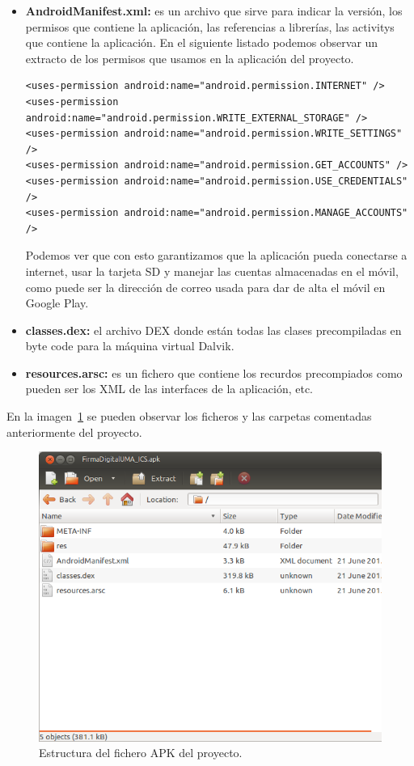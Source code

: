 \begin{itemize}
\item \textbf{AndroidManifest.xml:} es un archivo que sirve para indicar la versión, los permisos que contiene la aplicación, las referencias a librerías, las activitys que contiene la aplicación. En el siguiente listado podemos observar un extracto de los permisos que usamos en la aplicación del proyecto.

\begin{lstlisting}[style=XML]
<uses-permission android:name="android.permission.INTERNET" />
<uses-permission android:name="android.permission.WRITE_EXTERNAL_STORAGE" />
<uses-permission android:name="android.permission.WRITE_SETTINGS" />
<uses-permission android:name="android.permission.GET_ACCOUNTS" />
<uses-permission android:name="android.permission.USE_CREDENTIALS" />
<uses-permission android:name="android.permission.MANAGE_ACCOUNTS" />
\end{lstlisting}

Podemos ver que con esto garantizamos que la aplicación pueda conectarse a internet, usar la tarjeta SD y manejar las cuentas almacenadas en el móvil, como puede ser la dirección de correo usada para dar de alta el móvil en Google Play.

\item \textbf{classes.dex:} el archivo DEX donde están todas las clases precompiladas en byte code para la máquina virtual Dalvik.

\item \textbf{resources.arsc:} es un fichero que contiene los recurdos precompiados como pueden ser los XML de las interfaces de la aplicación, etc.

\end{itemize}

En la imagen~\ref{fig:estructuraAPK} se pueden observar los ficheros y las carpetas comentadas anteriormente del proyecto.

\begin{figure}[h]
  \centering
    \includegraphics[scale=0.8]{./Android/imagenes/estructuraAPK.png}
  \caption{Estructura del fichero APK del proyecto.}
  \label{fig:estructuraAPK}
\end{figure}

